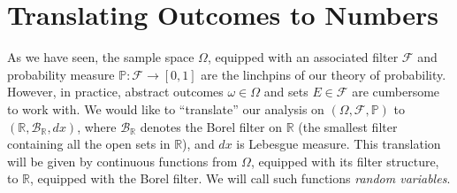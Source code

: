 \documentclass[12pt]{article}
\newcommand{\rr}{\mathbb{R}}
\newcommand{\filter}{\mathcal{F}}
\newcommand{\borel}{\mathcal{B}}
\newcommand{\prob}{\mathbb{P}}
\theoremstyle{plain}
\theoremstyle{definition}
\theoremstyle{remark}
\numberwithin{equation}{section}  %
\begin{document}
\section{Translating Outcomes to Numbers}
As we have seen, the sample space $\Omega$, equipped with an associated filter
$\filter$ and probability measure $\prob: \filter \to [0,1]$ 
are the linchpins of our theory of probability. However, in practice,
abstract outcomes $\omega \in \Omega$ and sets $E \in \filter$ are
cumbersome to work with. We would like to ``translate'' our analysis
on $(\Omega, \filter, \prob)$ to $(\rr, \borel_{\rr}, dx)$,
where $\borel_{\rr}$ denotes the Borel filter on $\rr$ (the smallest 
filter containing all the open sets in $\rr$), and $dx$ is
Lebesgue measure. This translation will be given by continuous functions from
$\Omega$, equipped with its filter structure, to $\rr$,
equipped with the Borel filter. We will call such functions 
\emph{random variables}.
\end{document}
